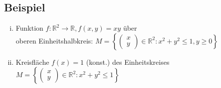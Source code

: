 \documentclass[11pt,a4paper]{book}
\newcommand {\R}	{\mathbb{R}}
\newcommand {\Rzwei}	{\mathbb{R}^2}
\newcommand{\1}    	{\mathbbm{1}}
\begin{document}
\subsection{Beispiel}
\begin{enumerate}[(i)]
	\item Funktion \(f:\Rzwei \rightarrow \R, f(x,y) = xy\) über \\ 
	oberen Einheitshalbkreis:
	\(M = \left\{ \left( \begin{array}{c}
		x \\ y	
	\end{array}\right) \in \Rzwei : x^2 + y^2 \leqslant 1, y \geqslant 0 \right\} \)
	\item Kreisfläche \(f(x) = 1\) (konst.) des Einheitskreises
	\(M = \left\{ \left( \begin{array}{c}
		x \\ y	
	\end{array}\right) \in \Rzwei : x^2 + y^2 \leqslant 1\right\} \)
\end{enumerate}
\end{document}
